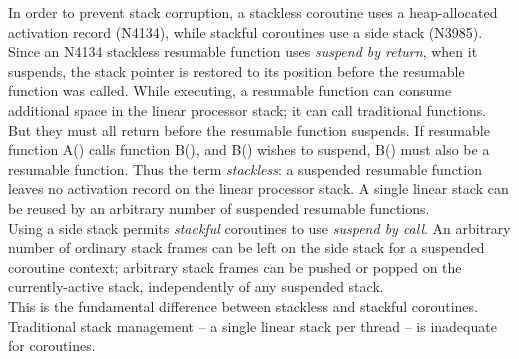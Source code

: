 In order to prevent stack corruption, a stackless coroutine uses a heap-allocated
activation record (N4134\cite{N4134}), while stackful coroutines use a side
stack (N3985\cite{N3985}).\\
Since an N4134 stackless resumable function uses \emph{suspend by return},
when it suspends, the stack pointer is restored to its position before the
resumable function was called. While executing, a resumable function can
consume additional space in the linear processor stack; it can call
traditional functions. But they must all return before the resumable function
suspends. If resumable function A() calls function B(), and B() wishes to
suspend, B() must also be a resumable function. Thus the
term \emph{stackless}: a suspended resumable function leaves no activation
record on the linear processor stack. A single linear stack can be reused by
an arbitrary number of suspended resumable functions.\\
Using a side stack permits \emph{stackful} coroutines to use \emph{suspend by
call}. An arbitrary number of ordinary stack frames can be left on the side
stack for a suspended coroutine context; arbitrary stack frames can be pushed
or popped on the currently-active stack, independently of any suspended stack.\\
This is the fundamental difference between stackless and stackful coroutines.\\
\newline
Traditional stack management -- a single linear stack per thread -- is
inadequate for coroutines.
